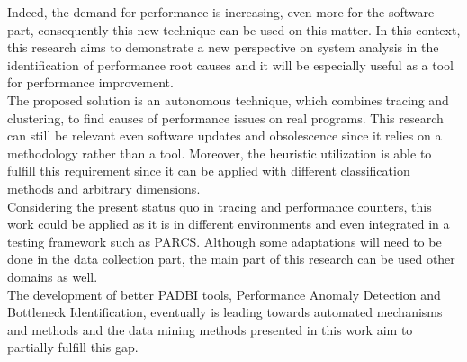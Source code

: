 \label{sec:Theme3}

Indeed, the demand for performance is increasing, even more for the software part, consequently this new technique can be used on this matter. In this context, this research aims to demonstrate a new perspective on system analysis in the identification of performance root causes and it will be especially useful as a tool for performance improvement. \\
The proposed solution is an autonomous technique, which combines tracing and clustering, to find causes of performance issues on real programs. This research can still be relevant even software updates and obsolescence since it relies on a methodology rather than a tool. Moreover, the heuristic utilization is able to fulfill this requirement since it can be applied with different classification methods and arbitrary dimensions. \\
Considering the present status quo in tracing and performance counters, this work could be applied as it is in different environments and even integrated in a testing framework such as PARCS. Although some adaptations will need to be done in the data collection part, the main part of this research can be used other domains as well.\\
The development of better PADBI tools, Performance Anomaly Detection and Bottleneck Identification, eventually is leading towards automated mechanisms and methods and the data mining methods presented in this work aim to partially fulfill this gap.
